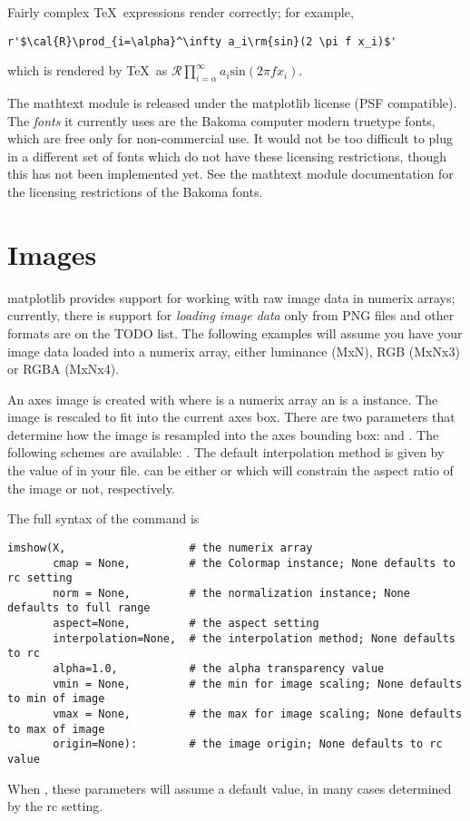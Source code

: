 \documentclass[twoside,10pt]{book}
\begin{document}
\noindent Fairly complex \TeX\ expressions render correctly; for example, 
\begin{lstlisting}
r'$\cal{R}\prod_{i=\alpha}^\infty a_i\rm{sin}(2 \pi f x_i)$'
\end{lstlisting}
which is rendered by \TeX\ as $\mathcal{R}\prod_{i=\alpha}^\infty
a_i\mathrm{sin}(2 \pi f x_i)$.  

The mathtext module is released under the matplotlib license (PSF
compatible).  The \textit{fonts} it currently uses are the Bakoma
computer modern truetype fonts, which are free only for non-commercial
use.  It would not be too difficult to plug in a different set of
fonts which do not have these licensing restrictions, though this has
not been implemented yet.  See the mathtext module documentation for
the licensing restrictions of the Bakoma fonts.

\section*{\myheadersize Images}

matplotlib provides support for working with raw image data in numerix
arrays; currently, there is support for \textit{loading image data}
only from PNG files and other formats are on the TODO list.  The
following examples will assume you have your image data loaded into a
numerix array, either luminance (MxN), RGB (MxNx3) or RGBA (MxNx4).

An axes image is created with  where  is
a numerix array an  is a 
instance.  The image is rescaled to fit into the current axes box.
There are two parameters that determine how the image is resampled
into the axes bounding box:  and .
The following  schemes are available:
.  The default
interpolation method is given by the value of 
in your  file.   can be either
 or  which will constrain the aspect ratio of
the image or not, respectively.  

The full syntax of the  command is
\begin{lstlisting}
imshow(X,                   # the numerix array
       cmap = None,         # the Colormap instance; None defaults to rc setting
       norm = None,         # the normalization instance; None defaults to full range
       aspect=None,         # the aspect setting
       interpolation=None,  # the interpolation method; None defaults to rc
       alpha=1.0,           # the alpha transparency value
       vmin = None,         # the min for image scaling; None defaults to min of image
       vmax = None,         # the max for image scaling; None defaults to max of image
       origin=None):        # the image origin; None defaults to rc value

\end{lstlisting}
When , these parameters will assume a default value, in many
cases determined by the rc setting.  
\end{document}
